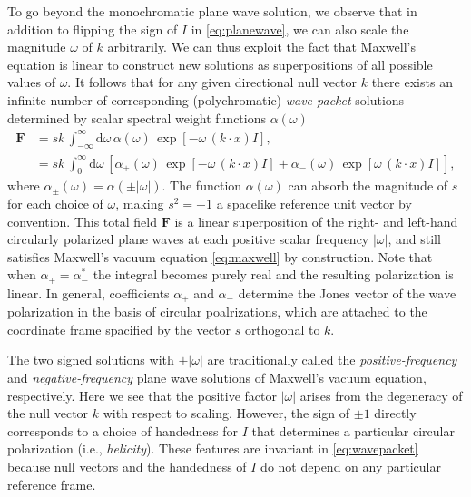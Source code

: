 \documentclass[1p,sort&compress]{elsarticle}
\numberwithin{equation}{section}
\newcommand{\bv}[1]{\mathbf{#1}}
\begin{document}
To go beyond the monochromatic plane wave solution, we observe that in addition to flipping the sign of $I$ in \eqref{eq:planewave}, we can also scale the magnitude $\omega$ of $k$ arbitrarily.  We can thus exploit the fact that Maxwell's equation is linear to construct new solutions as superpositions of all possible values of $\omega$.  It follows that for any given directional null vector $k$ there exists an infinite number of corresponding (polychromatic) \emph{wave-packet} solutions determined by scalar spectral weight functions $\alpha(\omega)$ 
\begin{align}\label{eq:wavepacket}
  \bv{F} &= sk\, \int_{-\infty}^\infty \! \textrm{d}\omega\, \alpha(\omega)\,\exp[-\omega\,(k\cdot x) I], \\
  &= sk\, \int_0^\infty \! \textrm{d}\omega\,[\alpha_+(\omega)\,\exp[-\omega\,(k\cdot x) I] + \alpha_-(\omega)\,\exp[\omega\,(k\cdot x) I]], \nonumber
\end{align}
where $\alpha_\pm(\omega) = \alpha(\pm|\omega|)$.  The function $\alpha(\omega)$ can absorb the magnitude of $s$ for each choice of $\omega$, making $s^2 = -1$ a spacelike reference unit vector by convention.  This total field $\bv{F}$ is a linear superposition of the right- and left-hand circularly polarized plane waves at each positive scalar frequency $|\omega|$, and still satisfies Maxwell's vacuum equation \eqref{eq:maxwell} by construction.  Note that when $\alpha_+ = \alpha_-^*$ the integral becomes purely real and the resulting polarization is linear. In general, coefficients $\alpha_+$ and $\alpha_-$ determine the Jones vector of the wave polarization in the basis of circular poalrizations, which are attached to the coordinate frame spacified by the vector $s$ orthogonal to $k$.

The two signed solutions with $\pm |\omega|$ are traditionally called the \emph{positive-frequency} and \emph{negative-frequency} plane wave solutions of Maxwell's vacuum equation, respectively.  Here we see that the positive factor $|\omega|$ arises from the degeneracy of the null vector $k$ with respect to scaling.  However, the sign of $\pm 1$ directly corresponds to a choice of handedness for $I$ that determines a particular circular polarization (i.e., \emph{helicity}).  These features are invariant in \eqref{eq:wavepacket} because null vectors and the handedness of $I$ do not depend on any particular reference frame.  
\end{document}
